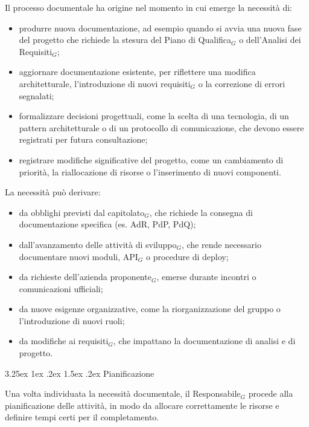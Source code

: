 \documentclass[a4paper, 10pt]{article}
\makeatletter
\renewcommand\paragraph{\@startsection{paragraph}{4}{\z@}%
  {3.25ex \@plus1ex \@minus .2ex}%
  {1.5ex \@plus .2ex}%
  {\normalfont\normalsize\bfseries}}
\makeatother
\begin{document}
Il processo documentale ha origine nel momento in cui emerge la necessità di:
\begin{itemize}
    \item produrre nuova documentazione, ad esempio quando si avvia una nuova fase del progetto che richiede la stesura del Piano di Qualifica$_G$ o dell'Analisi dei Requisiti$_G$;
    \item aggiornare documentazione esistente, per riflettere una modifica architetturale, l'introduzione di nuovi requisiti$_G$ o la correzione di errori segnalati;
    \item formalizzare decisioni progettuali, come la scelta di una tecnologia, di un pattern architetturale o di un protocollo di comunicazione, che devono essere registrati per futura consultazione;
    \item registrare modifiche significative del progetto, come un cambiamento di priorità, la riallocazione di risorse o l'inserimento di nuovi componenti.
\end{itemize}

La necessità può derivare:
\begin{itemize}
    \item da obblighi previsti dal capitolato$_G$, che richiede la consegna di documentazione specifica (es. AdR, PdP, PdQ);
    \item dall'avanzamento delle attività di sviluppo$_G$, che rende necessario documentare nuovi moduli, API$_G$ o procedure di deploy;
    \item da richieste dell'azienda proponente$_G$, emerse durante incontri o comunicazioni ufficiali;
    \item da nuove esigenze organizzative, come la riorganizzazione del gruppo o l'introduzione di nuovi ruoli;
    \item da modifiche ai requisiti$_G$, che impattano la documentazione di analisi e di progetto.
\end{itemize}

\paragraph{Pianificazione}

Una volta individuata la necessità documentale, il Responsabile$_G$ procede alla pianificazione delle attività, in modo da allocare correttamente le risorse e definire tempi certi per il completamento.
\end{document}
